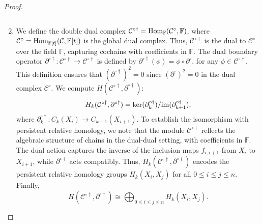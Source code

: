\begin{proof}
\begin{enumerate}
\[\]
\item We define the double dual complex \( \mathcal{C}^{\circ\dagger} = {\mathrm{Hom}}_{\mathbb{F}}(\mathcal{C}^\circ, {\mathbb{F}}) \), where \( \mathcal{C}^\circ = {\mathrm{Hom}}_{\mathbb{F}[t]}(\mathcal{C}, \mathbb{F}[t]) \) is the global dual complex. Thus, \( \mathcal{C}^{\circ\dagger} \) is the dual to \( \mathcal{C}^\circ \) over the field \( \mathbb{F} \), capturing cochains with coefficients in \( \mathbb{F} \). The dual boundary operator \( \partial^{\circ\dagger}: \mathcal{C}^{\circ\dagger} \to \mathcal{C}^{\circ\dagger} \) is defined by $\partial^{\circ\dagger}(\phi) = \phi \circ \partial^\circ$, for any \( \phi \in \mathcal{C}^{\circ\dagger} \). This definition ensures that \( (\partial^{\circ\dagger})^2 = 0 \) since \( (\partial^\circ)^2 = 0 \) in the dual complex \( \mathcal{C}^\circ \). We compute \( H(\mathcal{C}^{\circ\dagger}, \partial^{\circ\dagger}) \):
\[
H_k(\mathcal{C}^{\circ\dagger}, \partial^{\circ\dagger}) = \ker(\partial^{\circ\dagger}_k) / \mathrm{im}(\partial^{\circ\dagger}_{k+1}),
\]
where \( \partial^{\circ\dagger}_k: C_k(X_i) \to C_{k-1}(X_{i+1}) \). To establish the isomorphism with persistent relative homology, we note that the module \( \mathcal{C}^{\circ\dagger} \) reflects the algebraic structure of chains in the dual-dual setting, with coefficients in \( \mathbb{F} \). The dual action captures the inverse of the inclusion maps \( f_{i,i+1} \) from \( X_i \) to \( X_{i+1} \), while \( \partial^{\circ\dagger} \) acts compatibly. Thus, \( H_k(\mathcal{C}^{\circ\dagger}, \partial^{\circ\dagger}) \) encodes the persistent relative homology groups \( H_k(X_i, X_j) \) for all \( 0 \leq i \leq j \leq n \). Finally,
\[
H(\mathcal{C}^{\circ\dagger}, \partial^{\circ\dagger}) \cong \bigoplus_{0 \leq i \leq j \leq n} H_k(X_i, X_j).
\]
\end{enumerate}
\end{proof}

